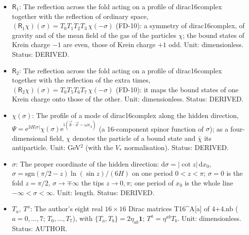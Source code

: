 \documentclass[
  10pt,
]{article}
\providecommand{\tightlist}{%
  \setlength{\itemsep}{0pt}\setlength{\parskip}{0pt}}
\begin{document}
\begin{itemize}
\tightlist
\item
  \(\mathsf{R}_1\): The reflection across the fold acting on a profile
  of dirac16complex together with the reflection of ordinary space,
  \((\mathsf{R}_1\chi)(\sigma) = T_0T_1T_2T_3\,\chi(-\sigma)\) (FD-10):
  a symmetry of dirac16complex, of gravity and of the mean field of the
  gas of the particles \(\chi\); the bound states of Krein charge \(-1\)
  are even, those of Krein charge \(+1\) odd. Unit: dimensionless.
  Status: DERIVED.
\item
  \(\mathsf{R}_2\): The reflection across the fold acting on a profile
  of dirac16complex together with the reflection of the extra times,
  \((\mathsf{R}_2\chi)(\sigma) = T_0T_5T_6T_7\,\chi(-\sigma)\) (FD-10):
  it maps the bound states of one Krein charge onto those of the other.
  Unit: dimensionless. Status: DERIVED.
\item
  \(\chi(\sigma)\): The profile of a mode of dirac16complex along the
  hidden direction,
  \(\Psi = \mathrm{e}^{3H\lvert\sigma\rvert}\chi(\sigma)\mathrm{e}^{\mathrm{i}(\vec k\cdot\vec x - \omega x_4)}\)
  (a 16-component spinor function of \(\sigma\)); as a four-dimensional
  field, \(\chi\) denotes the particle of a bound state and \(\bar\chi\)
  its antiparticle. Unit: GeV\(^{2}\) (with the \(V_*\) normalisation).
  Status: DERIVED.
\item
  \(\sigma\): The proper coordinate of the hidden direction:
  \(\mathrm{d}\sigma = \lvert\cot z\rvert\,\mathrm{d}x_0\),
  \(\sigma = \mathrm{sgn}(\pi/2 - z)\ln(\sin z)/(6H)\) on one period
  \(0 < z < \pi\); \(\sigma = 0\) is the fold \(z = \pi/2\),
  \(\sigma \to \mp\infty\) the tips \(z \to 0, \pi\); one period of
  \(x_0\) is the whole line \(-\infty < \sigma < \infty\). Unit: length.
  Status: DERIVED.
\item
  \(T_a,\ T^a\): The author's eight real \(16 \times 16\) Dirac matrices
  T16\^{}A{[}a{]} of 4+4.nb (\(a = 0, \dots, 7\); \(T_0, \dots, T_7\)),
  with \(\{T_a, T_b\} = 2\eta_{ab}\mathbf{1}\); \(T^a = \eta^{ab}T_b\).
  Unit: dimensionless. Status: AUTHOR.
\end{itemize}
\end{document}
